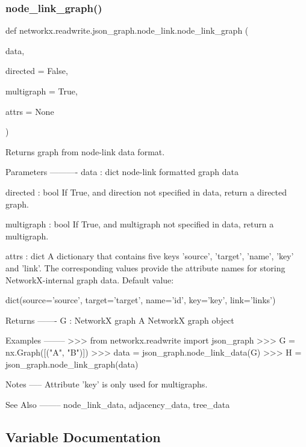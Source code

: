 \subsubsection{\texorpdfstring{node\+\_\+link\+\_\+graph()}{node\_link\_graph()}}
{\footnotesize\ttfamily def networkx.\+readwrite.\+json\+\_\+graph.\+node\+\_\+link.\+node\+\_\+link\+\_\+graph (\begin{DoxyParamCaption}\item[{}]{data,  }\item[{}]{directed = {\ttfamily False},  }\item[{}]{multigraph = {\ttfamily True},  }\item[{}]{attrs = {\ttfamily None} }\end{DoxyParamCaption})}

\begin{DoxyVerb}Returns graph from node-link data format.

Parameters
----------
data : dict
    node-link formatted graph data

directed : bool
    If True, and direction not specified in data, return a directed graph.

multigraph : bool
    If True, and multigraph not specified in data, return a multigraph.

attrs : dict
    A dictionary that contains five keys 'source', 'target', 'name',
    'key' and 'link'.  The corresponding values provide the attribute
    names for storing NetworkX-internal graph data.  Default value:

        dict(source='source', target='target', name='id',
            key='key', link='links')

Returns
-------
G : NetworkX graph
    A NetworkX graph object

Examples
--------
>>> from networkx.readwrite import json_graph
>>> G = nx.Graph([("A", "B")])
>>> data = json_graph.node_link_data(G)
>>> H = json_graph.node_link_graph(data)

Notes
-----
Attribute 'key' is only used for multigraphs.

See Also
--------
node_link_data, adjacency_data, tree_data
\end{DoxyVerb}
 

\subsection{Variable Documentation}
\mbox{\label{namespacenetworkx_1_1readwrite_1_1json__graph_1_1node__link_a2fd1ba094fcb4f8118f87826eb942768}} 
